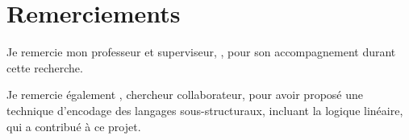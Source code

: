 %
\section*{Remerciements}
\label{sec::remerciements}

Je remercie mon professeur et superviseur, \thesisTeacher, pour son accompagnement durant cette recherche. 

Je remercie également \thesisContributor, chercheur collaborateur, pour avoir proposé une technique d'encodage des langages sous-structuraux, incluant la logique linéaire, qui a contribué à ce projet.

